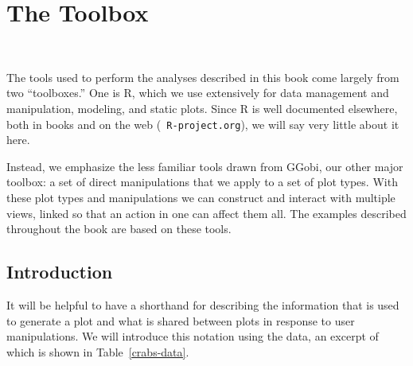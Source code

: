 
\chapter[The Toolbox]{The Toolbox}~\label{toolbox}


The tools used to perform the analyses described in this book come
largely from two ``toolboxes.''  One is R, which we use extensively
for data management and manipulation, modeling, and static plots.
Since R is well documented elsewhere, both in books
\cite{Dalgaard2002,VR02,Murrell2005} and on the web ({\tt
R-project.org}), we will say very little about it here.

Instead, we emphasize the less familiar tools drawn from GGobi, our
other major toolbox: a set of direct manipulations that we apply to a
set of plot types. With these plot types and manipulations we can
construct and interact with multiple views, linked so that an action
in one can affect them all.  The examples described throughout the
book are based on these tools.

\section{Introduction}


It will be helpful to have a shorthand for describing the information
that is used to generate a plot and what is shared between plots in
response to user manipulations.  We will introduce this notation using
the  data, an excerpt of which is shown in
Table~\ref{crabs-data}.

